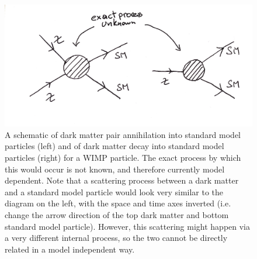 
\begin{figure}[hbtp]
    \centering
    \includegraphics[width=\textwidth]{figures/DM_processes.pdf}
    \caption{A schematic of dark matter pair annihilation into standard model particles (left) and of dark matter decay into standard model particles (right) for a WIMP particle. The exact process by which this would occur is not known, and therefore currently model dependent. Note that a scattering process between a dark matter and a standard model particle would look very similar to the diagram on the left, with the space and time axes inverted (i.e. change the arrow direction of the top dark matter and bottom standard model particle). However, this scattering might happen via a very different internal process, so the two cannot be directly related in a model independent way.}
    \label{fig:DM_ann_decay_processes}
\end{figure}

